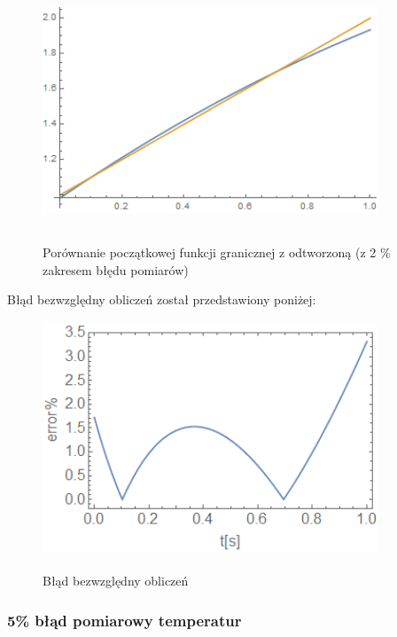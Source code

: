 \documentclass[twoside]{projektInzynierskiMS1}
\begin{document}
\begin{figure}[H]
\begin{center}
		\includegraphics[height=7cm, width=10cm]{pics/2reconstruction.png}\\
	\caption{Porównanie początkowej funkcji granicznej z odtworzoną (z 2 \% zakresem błędu pomiarów)}
\end{center}
\end{figure}

Błąd bezwzględny obliczeń został przedstawiony poniżej: \\

\begin{figure}[H]
\begin{center}
		\includegraphics[height=7cm, width=10cm]{pics/2abs.png}\\
	\caption{Błąd bezwzględny obliczeń}
\end{center}
\end{figure}



\subsubsection{5\% błąd pomiarowy temperatur}
\end{document}
